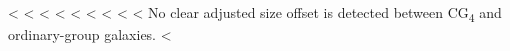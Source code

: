 \documentclass{aa}
\newcommand{\CB}{Control\textsubscript{4B}}
\newcommand{\CC}{Control\textsubscript{4C}}
\newcommand{\CG}{CG\textsubscript{4}}
\newcommand{\RG}{RG\textsubscript{4}}
\begin{document}
<%
<%
<%
<%
<%
<%
<%
<%
<%
No clear adjusted size offset is detected between \CG{} and ordinary-group galaxies. <%
\end{document}
